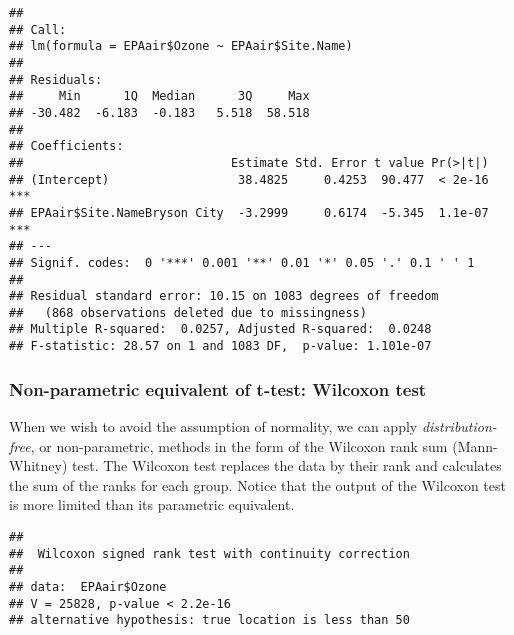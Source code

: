 \documentclass[]{article}
\newenvironment{Shaded}{\begin{snugshade}}{\end{snugshade}}
\newcommand{\KeywordTok}[1]{\textcolor[rgb]{0.13,0.29,0.53}{\textbf{#1}}}
\newcommand{\DataTypeTok}[1]{\textcolor[rgb]{0.13,0.29,0.53}{#1}}
\newcommand{\DecValTok}[1]{\textcolor[rgb]{0.00,0.00,0.81}{#1}}
\newcommand{\StringTok}[1]{\textcolor[rgb]{0.31,0.60,0.02}{#1}}
\newcommand{\CommentTok}[1]{\textcolor[rgb]{0.56,0.35,0.01}{\textit{#1}}}
\newcommand{\OperatorTok}[1]{\textcolor[rgb]{0.81,0.36,0.00}{\textbf{#1}}}
\newcommand{\NormalTok}[1]{#1}
\begin{document}
\begin{verbatim}
## 
## Call:
## lm(formula = EPAair$Ozone ~ EPAair$Site.Name)
## 
## Residuals:
##     Min      1Q  Median      3Q     Max 
## -30.482  -6.183  -0.183   5.518  58.518 
## 
## Coefficients:
##                             Estimate Std. Error t value Pr(>|t|)    
## (Intercept)                  38.4825     0.4253  90.477  < 2e-16 ***
## EPAair$Site.NameBryson City  -3.2999     0.6174  -5.345  1.1e-07 ***
## ---
## Signif. codes:  0 '***' 0.001 '**' 0.01 '*' 0.05 '.' 0.1 ' ' 1
## 
## Residual standard error: 10.15 on 1083 degrees of freedom
##   (868 observations deleted due to missingness)
## Multiple R-squared:  0.0257, Adjusted R-squared:  0.0248 
## F-statistic: 28.57 on 1 and 1083 DF,  p-value: 1.101e-07
\end{verbatim}

\subsubsection{Non-parametric equivalent of t-test: Wilcoxon
test}\label{non-parametric-equivalent-of-t-test-wilcoxon-test}

When we wish to avoid the assumption of normality, we can apply
\emph{distribution-free}, or non-parametric, methods in the form of the
Wilcoxon rank sum (Mann-Whitney) test. The Wilcoxon test replaces the
data by their rank and calculates the sum of the ranks for each group.
Notice that the output of the Wilcoxon test is more limited than its
parametric equivalent.

\begin{Shaded}
\end{Shaded}

\begin{verbatim}
## 
##  Wilcoxon signed rank test with continuity correction
## 
## data:  EPAair$Ozone
## V = 25828, p-value < 2.2e-16
## alternative hypothesis: true location is less than 50
\end{verbatim}

\begin{Shaded}
\end{Shaded}
\end{document}
